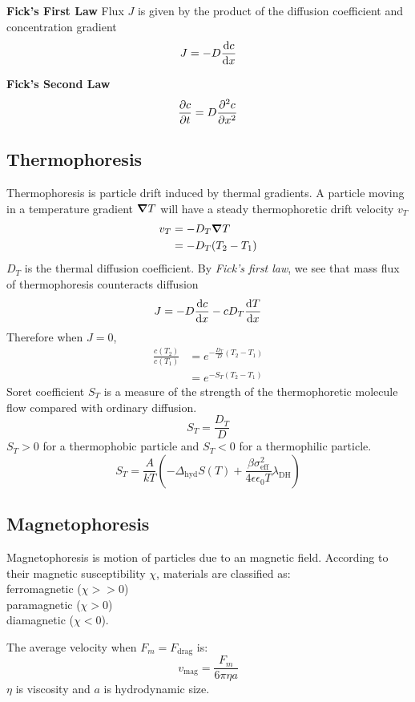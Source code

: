 \textbf{Fick's First Law}
Flux $J$ is given by the product of the diffusion coefficient and concentration gradient
\begin{equation*}
    J = -D \derivative{c}{x}
\end{equation*}

\textbf{Fick's Second Law}
\begin{equation*}
    \pdv{c}{t} = D \pdv[2]{c}{x}
\end{equation*}

\subsection*{Thermophoresis}
Thermophoresis is particle drift induced by thermal gradients. A particle moving in a temperature gradient
$\grad T$ will have a steady thermophoretic drift velocity $v_T$
\begin{equation*}
    \begin{aligned}
        v_T &=-D_T \grad T \\
        &= -D_T (T_2 - T_1)
    \end{aligned}
\end{equation*}
$D_T$ is the thermal diffusion coefficient.
By \textit{Fick's first law}, we see that mass flux of thermophoresis counteracts diffusion
\begin{equation*}
    J = -D \dv{c}{x} - c D_T \dv{T}{x}
\end{equation*}
Therefore when $J = 0$,
\begin{equation*}
    \begin{aligned}
        \frac{c(T_2)}{c(T_1)} &= e^{-\frac{D_T}{D}(T_2 - T_1)} \\
        &= e^{-S_T(T_2 - T_1)}
    \end{aligned}
\end{equation*}
Soret coefficient $S_T$ is a measure of the strength of the thermophoretic molecule flow compared with ordinary diffusion.
\begin{equation*}
    S_T = \frac{D_T}{D}
\end{equation*}
$S_T > 0$ for a thermophobic particle and $S_T < 0$ for a thermophilic particle.
\begin{equation*}
    S_T = \frac{A}{kT} \left( - \Delta_{\textrm{hyd}}S(T) + \frac{\beta \sigma^2_{\textrm{eff}}}{4 \epsilon \epsilon_0T}\lambda_{\textrm{DH}}\right)
\end{equation*}
\subsection*{Magnetophoresis}
Magnetophoresis is motion of particles due to an magnetic field. According to their magnetic susceptibility $\chi$,
materials are classified as: \\
ferromagnetic ($\chi >> 0$) \\
paramagnetic ($\chi > 0$) \\
diamagnetic ($\chi < 0$).

The average velocity when $F_m = F_{\textrm{drag}}$ is:
\begin{equation*}
    v_{\textrm{mag}} = \frac{F_m}{6 \pi \eta a}
\end{equation*}
$\eta$ is  viscosity and $a$ is hydrodynamic size.

